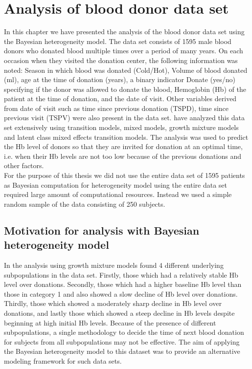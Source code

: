 
\chapter{Analysis of blood donor data set}
\label{ch : blood_donor}
 
 In this chapter we have presented the analysis of the blood donor data set \citep{nasserinejad_prevalence_2015} using the Bayesian heterogeneity model. The data set consists of 1595 male blood donors who donated blood multiple times over a period of many years. On each occasion when they visited the donation center, the following information was noted: Season in which blood was donated (Cold/Hot), Volume of blood donated (ml), age at the time of donation (years), a binary indicator Donate (yes/no) specifying if the donor was allowed to donate the blood, Hemoglobin (Hb) of the patient at the time of donation, and the date of visit. Other variables derived from date of visit such as time since previous donation (TSPD), time since previous visit (TSPV) were also present in the data set. \citet{nasserinejad_predicting_2013,nasserinejad_prevalence_2015,nasserinejad_prediction_2016} have analyzed this data set extensively using transition models, mixed models, growth mixture models and latent class mixed effects transition models. The analysis was used to predict the Hb level of donors so that they are invited for donation at an optimal time, i.e. when their Hb levels are not too low because of the previous donations and other factors.\\

 For the purpose of this thesis we did not use the entire data set of 1595 patients as Bayesian computation for heterogeneity model using the entire data set required large amount of computational resources. Instead we used a simple random sample of the data consisting of 250 subjects.

\section{Motivation for analysis with Bayesian heterogeneity model}
 In the analysis using growth mixture models \citet{nasserinejad_prevalence_2015} found 4 different underlying subpopulations in the data set. Firstly, those which had a relatively stable Hb level over donations. Secondly, those which had a higher baseline Hb level than those in category 1 and also showed a slow decline of Hb level over donations. Thirdly, those which showed a moderately sharp decline in Hb level over donations, and lastly those which showed a steep decline in Hb levels despite beginning at high initial Hb levels. Because of the presence of different subpopulations, a single methodology to decide the time of next blood donation for subjects from all subpopulations may not be effective. The aim of applying the Bayesian heterogeneity model to this dataset was to provide an alternative modeling framework for such data sets.

